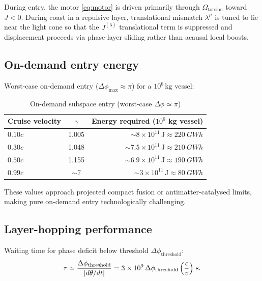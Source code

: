 \documentclass[dvipdfmx,a4paper]{article}
\theoremstyle{definition}
\begin{document}
During entry, the motor \eqref{eq:motor} is driven primarily through $\Omega_{\mathrm{torsion}}$ toward $J<0$. During coast in a repulsive layer, translational mismatch $\lambda^\mu$ is tuned to lie near the light cone so that the $J^{(5)}$ translational term is suppressed and displacement proceeds via phase-layer sliding rather than acausal local boosts.

\subsection{On-demand entry energy}

Worst-case on-demand entry ($\Delta\phi_{\max}\approx\pi$) for a $10^6\,\mathrm{kg}$ vessel:

\begin{table}[ht]
\centering
\caption{On-demand subspace entry (worst-case $\Delta\phi\simeq\pi$)}
\label{tab:ondemand}
\begin{tabular}{@{}lcr@{}}
\toprule
Cruise velocity & $\gamma$ & Energy required ($10^6$ kg vessel) \\
\midrule
$0.10c$ & 1.005 & $\sim 8\times 10^{11}\,\mathrm{J}\approx\qty{220}{GWh}$ \\
$0.30c$ & 1.048 & $\sim 7.5\times 10^{11}\,\mathrm{J}\approx\qty{210}{GWh}$ \\
$0.50c$ & 1.155 & $\sim 6.9\times 10^{11}\,\mathrm{J}\approx\qty{190}{GWh}$ \\
$0.99c$ & $\sim 7$ & $\sim 3\times 10^{11}\,\mathrm{J}\approx\qty{80}{GWh}$ \\
\bottomrule
\end{tabular}
\end{table}

These values approach projected compact fusion or antimatter-catalysed limits, making pure on-demand entry technologically challenging.

\subsection{Layer-hopping performance}

Waiting time for phase deficit below threshold $\Delta\phi_{\mathrm{threshold}}$:
\begin{equation}
\tau \simeq \frac{\Delta\phi_{\mathrm{threshold}}}{|d\theta/dt|}
= 3\times 10^9\,\Delta\phi_{\mathrm{threshold}}\,\Bigl(\frac{c}{v}\Bigr)~\mathrm{s}.
\label{eq:wait}
\end{equation}
\end{document}
